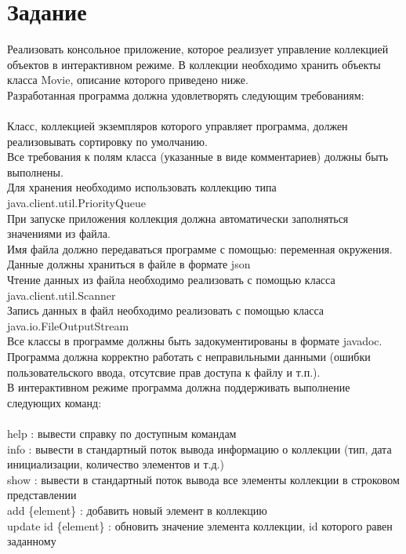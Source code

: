 

\section{Задание}
Реализовать консольное приложение, которое реализует управление коллекцией объектов в интерактивном режиме.
В коллекции необходимо хранить объекты класса Movie, описание которого приведено ниже.\\
Разработанная программа должна удовлетворять следующим требованиям:\\
\\
Класс, коллекцией экземпляров которого управляет программа, должен реализовывать сортировку по умолчанию.\\
Все требования к полям класса (указанные в виде комментариев) должны быть выполнены.\\
Для хранения необходимо использовать коллекцию типа java.client.util.PriorityQueue\\
При запуске приложения коллекция должна автоматически заполняться значениями из файла.\\
Имя файла должно передаваться программе с помощью: переменная окружения.\\
Данные должны храниться в файле в формате json\\
Чтение данных из файла необходимо реализовать с помощью класса java.client.util.Scanner\\
Запись данных в файл необходимо реализовать с помощью класса java.io.FileOutputStream\\
Все классы в программе должны быть задокументированы в формате javadoc.\\
Программа должна корректно работать с неправильными данными (ошибки пользовательского ввода, отсутсвие прав доступа к файлу и т.п.).\\
В интерактивном режиме программа должна поддерживать выполнение следующих команд:\\
\\
help : вывести справку по доступным командам\\
info : вывести в стандартный поток вывода информацию о коллекции (тип, дата инициализации, количество элементов и т.д.)\\
show : вывести в стандартный поток вывода все элементы коллекции в строковом представлении\\
add \{element\} : добавить новый элемент в коллекцию\\
update id \{element\} : обновить значение элемента коллекции, id которого равен заданному\\
